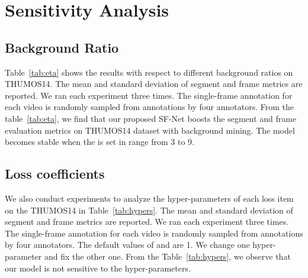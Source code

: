 \documentclass[runningheads]{llncs}
\begin{document}
	
	
	\section{Sensitivity Analysis}
	\subsection{Background Ratio}
	Table~\ref{tab:eta} shows the results with respect to different background ratios  on THUMOS14. 
	The mean and standard deviation of segment and frame metrics are reported. We ran each experiment three times. The single-frame annotation for each video is randomly sampled from annotations by four annotators.
	From the table~\ref{tab:eta}, we find that our proposed SF-Net boosts the segment and frame evaluation metrics on THUMOS14 dataset with background mining. 
The model becomes stable when the  is set in range from 3 to 9.
	
	\subsection{Loss coefficients}
	We also conduct experiments to analyze the hyper-parameters of each loss item on the THUMOS14 in Table~\ref{tab:hypers}.
	The mean and standard deviation of segment and frame metrics are reported. We ran each experiment three times. The single-frame annotation for each video is randomly sampled from annotations by four annotators.
	The default values of  and  are 1. We change one hyper-parameter and fix the other one.
	From the Table~\ref{tab:hypers}, we observe that our model is not sensitive to the hyper-parameters. 
	
\end{document}

